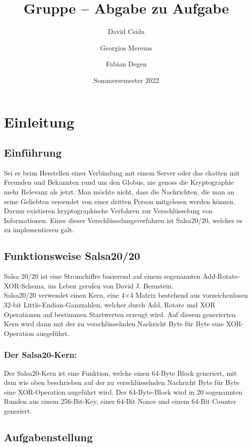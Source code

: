 \documentclass[course=erap]{aspdoc}
\author{David Csida \and Georgios Merezas \and Fabian Degen}
\date{Sommersemester 2022} %
\title{Gruppe \theGroup{} -- Abgabe zu Aufgabe \theNumber}
\begin{document}
\maketitle

\section{Einleitung}
\subsection{Einführung}
Sei es beim Herstellen einer Verbindung mit einem Server oder das chatten mit Freunden und Bekannten rund um den Globus, nie genoss die Kryptographie mehr Relevanz als jetzt.
Man möchte nicht, dass die Nachrichten, die man an seine Geliebten versendet von einer dritten Person mitgelesen werden können. Darum existieren kryptographische Verfahren zur Verschlüsselung von Informationen.
Eines dieser Verschlüsselungsverfahren ist Salsa20/20, welches es zu implementieren galt.

\subsection{Funktionsweise Salsa20/20}
Salsa 20/20 ist eine Stromchiffre basierend auf einem sogenannten Add-Rotate-XOR-Schema, ins Leben gerufen von David J. Bernstein.
\\Salsa20/20 verwendet einen Kern, eine 4$\times$4 Matrix bestehend aus vorzeichenlosen 32-bit Little-Endian-Ganzzahlen, welcher durch Add, Rotate und XOR Operationen auf bestimmen Startwerten erzeugt wird.
Auf diesem generierten Kern wird dann mit der zu verschlüsselnden Nachricht Byte für Byte eine XOR-Operation ausgeführt.

\subsubsection{Der Salsa20-Kern:}
Der Salsa20-Kern ist eine Funktion, welche einen 64-Byte Block generiert, mit dem wie oben beschrieben auf der zu verschlüsselnden Nachricht Byte für Byte eine XOR-Operation augeführt wird.
Der 64-Byte-Block wird in 20 sogenannten Runden aus einem 256-Bit-Key, einer 64-Bit Nonce und einem 64-Bit Counter generiert.

\subsection{Aufgabenstellung}
\end{document}
